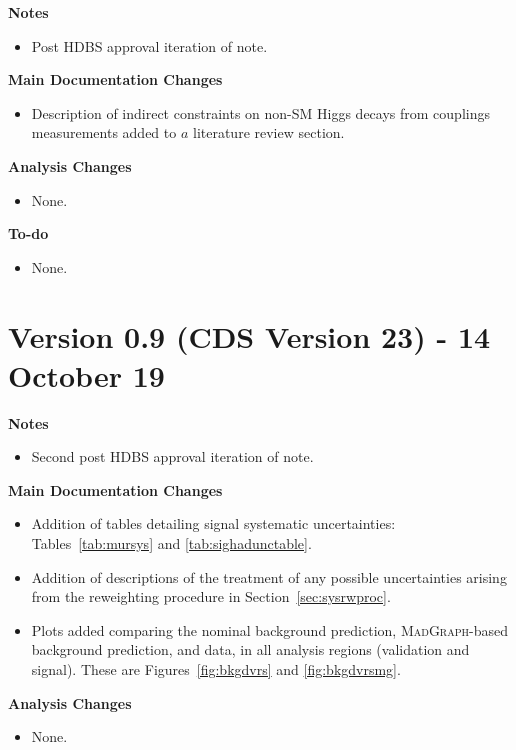 \documentclass[NOTE, atlasdraft=true, texlive=2017, UKenglish]{\ATLASLATEXPATH atlasdoc}
\begin{document}
\textbf{Notes}
\begin{itemize}
\item Post HDBS approval iteration of note.
\end{itemize}

\textbf{Main Documentation Changes}
\begin{itemize}
\item Description of indirect constraints on non-SM Higgs decays from couplings measurements added to $a$ literature review section.
\end{itemize}

\textbf{Analysis Changes}
\begin{itemize}
\item None.
\end{itemize}

\textbf{To-do}
\begin{itemize}
\item None.
\end{itemize}


\section*{Version 0.9 (CDS Version 23) - 14 October 19}

\textbf{Notes}
\begin{itemize}
\item Second post HDBS approval iteration of note.
\end{itemize}

\textbf{Main Documentation Changes}
\begin{itemize}
\item Addition of tables detailing signal systematic uncertainties: Tables~\ref{tab:mursys} and \ref{tab:sighadunctable}.
\item Addition of descriptions of the treatment of any possible uncertainties arising from the reweighting procedure in Section~\ref{sec:sysrwproc}.
\item Plots added comparing the nominal background prediction, \textsc{MadGraph}-based background prediction, and data, in all analysis regions (validation and signal). These are Figures~\ref{fig:bkgdvrs} and \ref{fig:bkgdvrsmg}.
\end{itemize}

\textbf{Analysis Changes}
\begin{itemize}
\item None.
\end{itemize}
\end{document}
